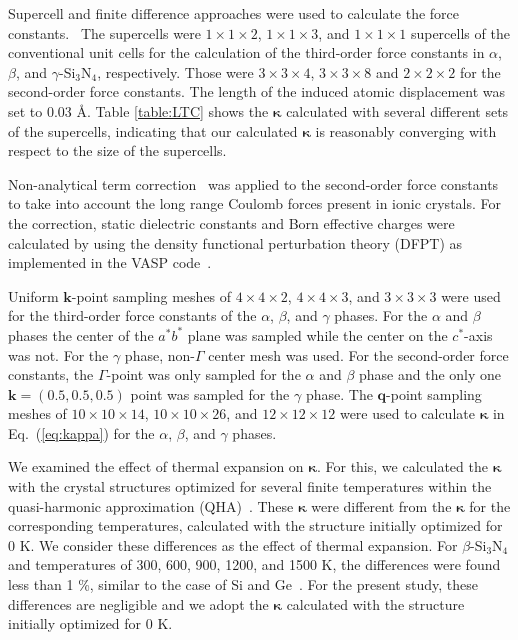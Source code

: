 \documentclass[twocolumn,amsmath,amssymb,a4paper,prb,superscriptaddress,floatfix]{revtex4-1}
\begin{document}
Supercell and finite difference approaches were used to calculate the force
constants.~\cite{wei-supercell} The supercells were $1\times 1\times2$, $1\times
1\times3$, and $1\times 1\times1$ supercells of the conventional unit cells for
the calculation of the third-order force constants in $\alpha$, $\beta$, and
$\gamma$-Si$_3$N$_4$, respectively. Those were $3\times 3\times4$, $3\times
3\times8$ and $2\times 2\times2$ for the second-order force constants.  The
length of the induced atomic displacement was set to 0.03 \AA.  Table
\ref{table:LTC} shows the $\boldsymbol{\kappa}$  calculated with several
different sets of the supercells, indicating that our calculated
$\boldsymbol{\kappa}$ is reasonably converging with respect to the size of the
supercells. 

Non-analytical term correction~\cite{wang} was applied to the second-order force
constants to take into account the long range Coulomb forces present in ionic
crystals. For the correction, static dielectric constants and Born effective
charges were calculated by using the density functional perturbation theory
(DFPT) as implemented in the VASP code~\cite{vasp-lepsiron,lepsiron}.

Uniform $\mathbf{k}$-point sampling meshes of $4\times 4\times 2$,
$4\times 4\times 3$, and $3\times 3\times 3$ were used for the
third-order force constants of the $\alpha$, $\beta$, and $\gamma$ phases. For the
$\alpha$ and $\beta$ phases the center of the $a^*b^*$ plane was sampled
while the center on the $c^*$-axis was not. For the
$\gamma$ phase, non-$\Gamma$ center mesh was used. For the second-order
force constants, the $\Gamma$-point was only sampled for the $\alpha$ and $\beta$
phase and the only one $\mathbf{k}=(0.5, 0.5, 0.5)$ point was
sampled for the $\gamma$ phase. The $\mathbf{q}$-point
sampling meshes of $10\times 10\times 14$, $10\times 10\times 26$, and
$12\times 12\times 12$ were used to calculate $\boldsymbol{\kappa}$ in Eq.~(\ref{eq:kappa})
for the $\alpha$, $\beta$, and $\gamma$ phases.

We examined the effect of thermal expansion on $\boldsymbol{\kappa}$. For this,
we calculated the $\boldsymbol{\kappa}$ with the crystal structures optimized
for several finite temperatures within the quasi-harmonic approximation
(QHA)~\cite{dove-p76}. These $\boldsymbol{\kappa}$ were different from the
$\boldsymbol{\kappa}$ for the corresponding temperatures, calculated with the
structure initially optimized for 0 K. We consider these differences as the
effect of thermal expansion.  For $\beta$-Si$_3$N$_4$ and temperatures of 300,
600, 900, 1200, and 1500 K, the differences were found less than 1 \%, similar
to the case of Si and Ge~\cite{ward-ltc}. For the present study, these
differences are negligible and we adopt the $\boldsymbol{\kappa}$ calculated
with the structure initially optimized for 0 K.
\end{document}
